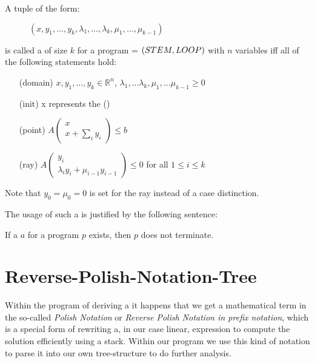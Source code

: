 \begin{definition}
	\label{def:gna}
	A tuple of the form:
	\begin{figure}[H]
		\centering
		$(x, y_1, \dots, y_k, \lambda_1, \dots, \lambda_k, \mu_1, \dots, \mu_{k-1})$
	\end{figure}  
	\vspace{-1em}
	is called a \gna of size $k$ for a program = $(STEM, LOOP)$ with $n$ variables iff all of the following statements hold:
	\begin{itemize}
		\setlength{\itemindent}{1in}
		\item[(domain)] $x, y_1, \dots, y_k \in \mathbb{R}^n$, $\lambda_1, \dots \lambda_k, \mu_1, \dots \mu_{k-1} \ge 0$
		\item[(init)] x represents the \startterm (\stem)
		\item[(point)] $A\begin{pmatrix} x \\ x + \sum_i y_i \end{pmatrix} \le b$
		\item[(ray)] $A\begin{pmatrix} y_i \\ \lambda_i y_i + \mu_{i-1} y_{i-1} \end{pmatrix} \le 0$ for all $1 \le i \le k$
	\end{itemize}
	Note that $y_0 = \mu_0 = 0$ is set for the ray instead of a case distinction. \cite{leike2014geometric}
\end{definition}

The usage of such a \gna is justified by the following sentence:
\begin{satz}
	\label{sen:gna-nonterm}
	If a \gna $a$ for a program $p$ exists, then $p$ does not terminate. \cite{leike2014geometric} 
\end{satz}

\section{Reverse-Polish-Notation-Tree}
\label{sec:rpntree}
Within the program of deriving a \gna it happens that we get a mathematical term in the so-called \textit{Polish Notation} or \textit{Reverse Polish Notation in prefix notation}, which is a special form of rewriting a, in our case linear, expression to compute the solution efficiently using a stack.\cite{wikirpn} Within our program we use this kind of notation to parse it into our own tree-structure to do further analysis.

